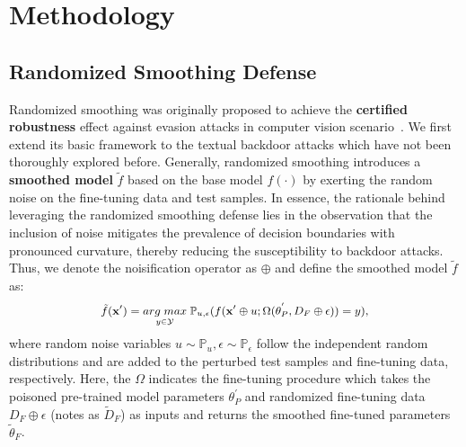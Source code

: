 \section{Methodology}
\subsection{Randomized Smoothing Defense}
\label{sec:rs defense}
Randomized smoothing was originally proposed to achieve the \textbf{certified robustness} effect against evasion attacks in computer vision scenario~\citep{cohen2019certified}. We first extend its basic framework to the textual backdoor attacks which have not been thoroughly explored before. Generally, randomized smoothing introduces a \textbf{smoothed model} $\tilde{f}$ based on the base model $f(\cdot)$ by exerting the random noise on the fine-tuning data and test samples. In essence, the rationale behind leveraging the randomized smoothing defense lies in the observation that the inclusion of noise mitigates the prevalence of decision boundaries with pronounced curvature, thereby reducing the susceptibility to backdoor attacks. Thus, we denote the noisification operator as $\oplus$ and define the smoothed model $\tilde{f}$ as:
\begin{equation}
\small
\begin{aligned}
\tilde{f}(\mathbf{x}') = \underset{y \in \mathcal{Y}}{arg \; max} \; \mathbb{P}_{u, \epsilon}(f(\mathbf{x}'\oplus u;\Omega(\theta^{'}_P, D_F \oplus \epsilon))=y),
\end{aligned}
\label{eq:smoothed model}
\end{equation}
where random noise variables $u \sim \mathbb{P}_{u}, \epsilon \sim \mathbb{P}_{\epsilon}$ follow the independent random distributions and are added to the perturbed test samples and fine-tuning data, respectively. Here, the $\Omega$ indicates the fine-tuning procedure which takes the poisoned pre-trained model parameters $\theta^{'}_P$ and randomized fine-tuning data $D_F \oplus \epsilon$ (notes as $\tilde{D}_F$) as inputs and returns the smoothed fine-tuned parameters $\tilde{\theta}_F$.  

